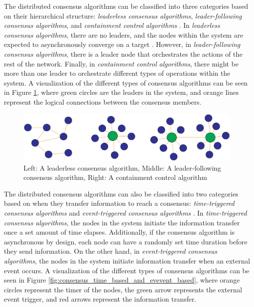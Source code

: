 The distributed consensus algorithms can be classified into three categories based on their hierarchical structure: \emph{leaderless consensus algorithms}, \emph{leader-following consensus algorithms}, and \emph{containment control algorithms} \cite{consensus_systems_survey}. In \emph{leaderless consensus algorithms}, there are no leaders, and the nodes within the system are expected to asynchronously converge on a target \cite{Ge_Han_2017}. However, in \emph{leader-following consensus algorithms}, there is a leader node that orchestrates the actions of the rest of the network. Finally, in \emph{containment control algorithms}, there might be more than one leader to orchestrate different types of operations within the system. A visualization of the different types of consensus algorithms can be seen in Figure \ref{fig:consensus_types_detailed}, where green circles are the leaders in the system, and orange lines represent the logical connections between the consensus members.


\begin{figure}[H]
    \centering
    \includegraphics[width=0.99\columnwidth]{images/consensus_types.png}
    \caption{Left: A leaderless consensus algorithm, Middle: A leader-following consensus algorithm, Right: A containment control algorithm}
    \label{fig:consensus_types_detailed}
\end{figure}


The distributed consensus algorithms can also be classified into two categories based on when they transfer information to reach a consensus: \emph{time-triggered consensus algorithms} and \emph{event-triggered consensus algorithms} \cite{consensus_systems_survey}. In \emph{time-triggered consensus algorithms}, the nodes in the system initiate the information transfer once a set amount of time elapses. Additionally, if the consensus algorithm is asynchronous by design, each node can have a randomly set time duration before they send information. On the other hand, in \emph{event-triggered consensus algorithms}, the nodes in the system initiate information transfer when an external event occurs. A visualization of the different types of consensus algorithms can be seen in Figure \ref{fig:consensus_time_based_and_evevent_based}, where orange circles represent the timer of the nodes, the green arrow represents the external event trigger, and red arrows represent the information transfer.

